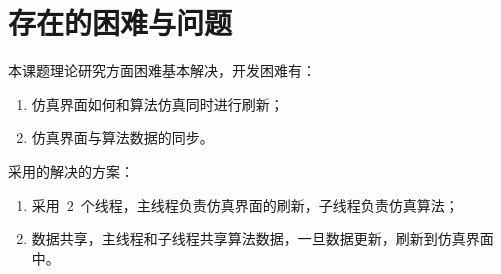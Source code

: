 \section{存在的困难与问题}

本课题理论研究方面困难基本解决，开发困难有：
\begin{enumerate}
    \item 仿真界面如何和算法仿真同时进行刷新；
    \item 仿真界面与算法数据的同步。
\end{enumerate}

采用的解决的方案：
\begin{enumerate}
    \item 采用~$2$~个线程，主线程负责仿真界面的刷新，子线程负责仿真算法；
    \item 数据共享，主线程和子线程共享算法数据，一旦数据更新，刷新到仿真界面中。
\end{enumerate}
